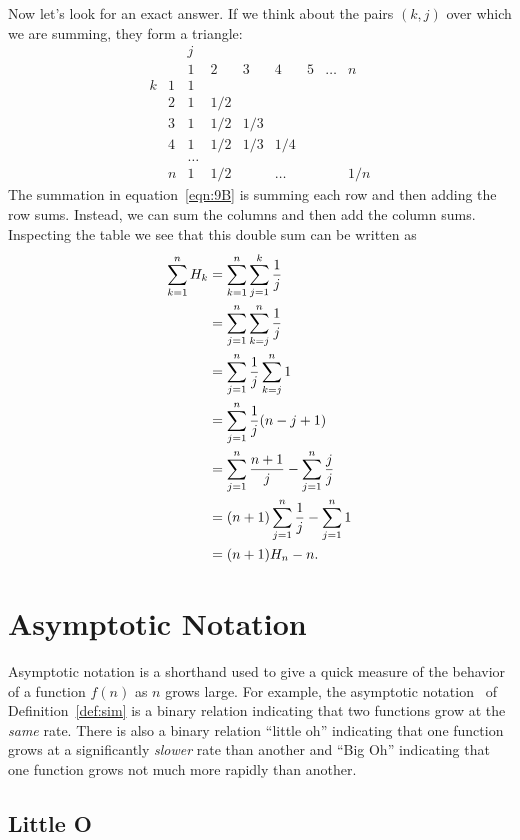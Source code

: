 Now let's look for an exact answer.  If we think about the pairs
$(k,j)$ over which we are summing, they form a triangle:
\[
\begin{array}{cc|ccccccc}
 &  & j &   &   &   &   &       &   \\
 &  & 1 & 2 & 3 & 4 & 5 & \dots & n \\
\hline
k & 1 & 1\\
  & 2 &1&1/2\\
  & 3 &1&1/2&1/3\\
  & 4 &1&1/2&1/3&1/4\\
  &   &\dots\\
  & n &1&1/2&&\dots&&&1/n
\end{array}
\]
The summation in equation~\ref{eqn:9B} is summing each row and then
adding the row sums.  Instead, we can sum the columns and then add the
column sums.  Inspecting the table we see that this double sum can be
written as
\begingroup
{}
\begin{align}
\sum_{k=1}^n H_k &= \sum_{k=1}^n \sum_{j=1}^k \frac{1}{j}\notag\\
&= \sum_{j=1}^n \sum_{k=j}^n \frac{1}{j}\notag\\
&= \sum_{j=1}^n \frac{1}{j} \sum_{k=j}^n 1\notag\\
&= \sum_{j=1}^n \frac1j (n-j+1)\notag\\
&= \sum_{j=1}^n \frac{n+1}j - \sum_{j=1}^n \frac{j}{j}\notag\\
&= (n+1)\sum_{j=1}^n \frac1j - \sum_{j=1}^n 1\notag\\
&= (n+1)H_n-n.\label{sHk}
\end{align}
\endgroup


\section{Asymptotic Notation}\label{asymptotic_sec}

Asymptotic notation is a shorthand used to give a quick measure of the
behavior of a function $f(n)$ as $n$ grows large.  For example, the
asymptotic notation~\idx{$\sim$} of Definition~\ref{def:sim} is a
binary relation indicating that two functions grow at the \emph{same}
rate.  There is also a binary relation ``little oh'' indicating that
one function grows at a significantly \emph{slower} rate than another
and ``Big Oh'' indicating that one function grows not much more
rapidly than another.

\subsection{Little O}

